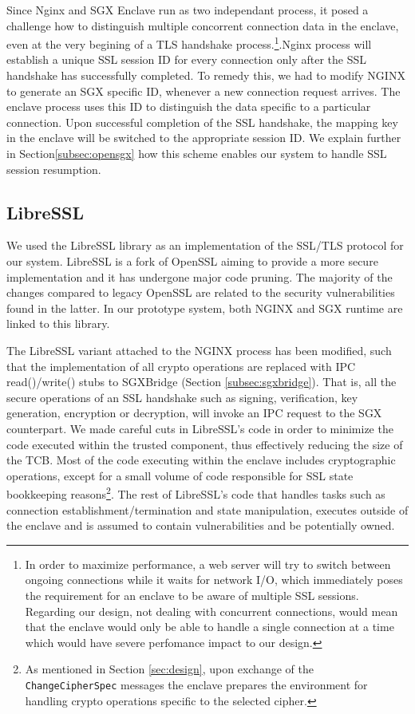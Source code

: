 \documentclass[../main.tex]{subfiles}
\begin{document}
Since Nginx and SGX Enclave run as two independant process, it posed a challenge
how to distinguish multiple concorrent connection data in the enclave, even at the 
very begining of a TLS handshake process.\footnote{In order to maximize
performance, a web server will try to switch between ongoing connections while
it waits for network I/O, which immediately poses the requirement for an
enclave to be aware of multiple SSL sessions. Regarding our design, not dealing
with concurrent connections, would mean that the enclave would only be able to
handle a single connection at a time which would have severe perfomance impact
to our design.}.Nginx process will establish a unique SSL session ID for every 
connection only after the SSL handshake has successfully completed. To remedy this, 
we had to modify NGINX to generate an SGX specific ID, whenever a new connection 
request arrives. The enclave process uses this ID to distinguish the data specific 
to a particular connection. Upon successful completion of the SSL handshake, the 
mapping key in the enclave will be switched to the appropriate session ID. We explain 
further in Section\ref{subsec:opensgx} how this scheme enables our system to handle 
SSL session resumption.

\subsection{LibreSSL}
\label{subsec:libressl}
We used the LibreSSL library as an implementation of the SSL/TLS protocol for
our system. LibreSSL is a fork of OpenSSL aiming to provide a more secure
implementation and it has undergone major code pruning. The majority of the
changes compared to legacy OpenSSL are related to the security vulnerabilities
found in the latter. In our prototype system, both NGINX and SGX runtime are
linked to this library.

The LibreSSL variant attached to the NGINX process has been modified, such that
 the implementation of all crypto operations are replaced with IPC
read()/write() stubs to SGXBridge (Section \ref{subsec:sgxbridge}). That is,
all the secure operations of an SSL handshake such as signing, verification,
key generation, encryption or decryption, will invoke an IPC request to the SGX
counterpart. We made careful cuts in LibreSSL's code in order to minimize the
code executed within the trusted component, thus effectively reducing the size
of the TCB. Most of the code executing within the enclave includes
cryptographic operations, except for a small volume of code responsible for
SSL state bookkeeping reasons\footnote{As mentioned in Section
\ref{sec:design}, upon exchange of the \texttt{ChangeCipherSpec} messages the
enclave prepares the environment for handling crypto operations specific to
the selected cipher.}. The rest of LibreSSL's code that handles tasks such as
connection establishment/termination and state manipulation, executes outside
of the enclave and is assumed to contain vulnerabilities and be potentially
owned.
\end{document}
